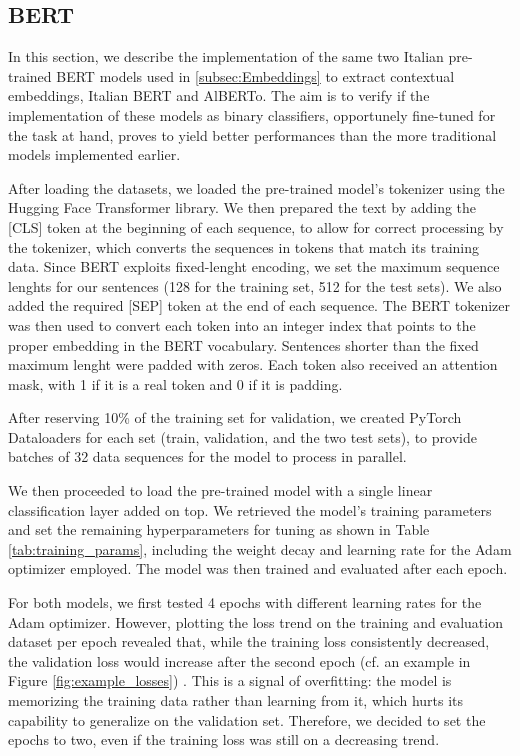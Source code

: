 \subsection{BERT}
\label{subsec:BERT_methods}
In this section, we describe the implementation of the same two Italian pre-trained BERT models used in \ref{subsec:Embeddings} to extract contextual embeddings, Italian BERT and AlBERTo. The aim is to verify if the implementation of these models as binary classifiers, opportunely fine-tuned for the task at hand, proves to yield better performances than the more traditional models implemented earlier.

After loading the datasets, we loaded the pre-trained model's tokenizer using the Hugging Face Transformer library. We then prepared the text by adding the [CLS] token at the beginning of each sequence, to allow for correct processing by the tokenizer, which converts the sequences in tokens that match its training data. Since BERT exploits fixed-lenght encoding, we set the maximum sequence lenghts for our sentences (128 for the training set, 512 for the test sets). We also added the required [SEP] token at the end of each sequence. The BERT tokenizer was then used to convert each token into an integer index that points to the proper embedding in the BERT vocabulary. Sentences shorter than the fixed maximum lenght were padded with zeros. Each token also received an attention mask, with 1 if it is a real token and 0 if it is padding.

After reserving 10\% of the training set for validation, we created PyTorch Dataloaders for each set (train, validation, and the two test sets), to provide batches of 32 data sequences for the model to process in parallel.

We then proceeded to load the pre-trained model with a single linear classification layer added on top. We retrieved the model's training parameters and set the remaining hyperparameters for tuning as shown in Table \ref{tab:training_params}, including the weight decay and learning rate for the Adam optimizer employed. The model was then trained and evaluated after each epoch.

For both models, we first tested 4 epochs with different learning rates for the Adam optimizer. However, plotting the loss trend on the training and evaluation dataset per epoch revealed that, while the training loss consistently decreased, the validation loss would increase after the second epoch (cf. an example in Figure \ref{fig:example_losses}) . This is a signal of overfitting: the model is memorizing the training data rather than learning from it, which hurts its capability to generalize on the validation set.
Therefore, we decided to set the epochs to two, even if the training loss was still on a decreasing trend. 

